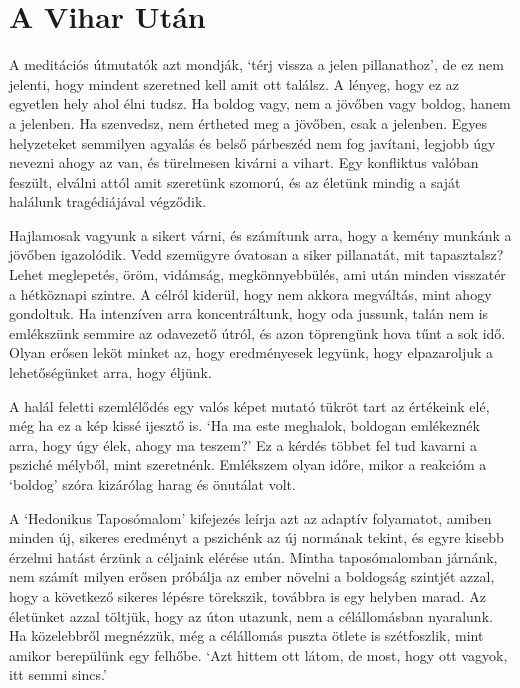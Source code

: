 \clearpage

\section{A Vihar Után}


\noindent A meditációs útmutatók azt mondják, `térj vissza a jelen
pillanathoz', de ez nem jelenti, hogy mindent szeretned kell amit ott
találsz. A lényeg, hogy ez az egyetlen hely ahol élni tudsz. Ha boldog
vagy, nem a jövőben vagy boldog, hanem a jelenben. Ha szenvedsz, nem
értheted meg a jövőben, csak a jelenben. Egyes helyzeteket semmilyen
agyalás és belső párbeszéd nem fog javítani, legjobb úgy nevezni ahogy
az van, és türelmesen kivárni a vihart. Egy konfliktus valóban feszült,
elválni attól amit szeretünk szomorú, és az életünk mindig a saját
halálunk tragédiájával végződik.

Hajlamosak vagyunk a sikert várni, és számítunk arra, hogy a kemény
munkánk a jövőben igazolódik. Vedd szemügyre óvatosan a siker
pillanatát, mit tapasztalsz? Lehet meglepetés, öröm, vidámság,
megkönnyebbülés, ami után minden visszatér a hétköznapi szintre. A
célról kiderül, hogy nem akkora megváltás, mint ahogy gondoltuk. Ha
intenzíven arra koncentráltunk, hogy oda jussunk, talán nem is
emlékszünk semmire az odavezető útról, és azon töprengünk hova tűnt a
sok idő. Olyan erősen leköt minket az, hogy eredményesek legyünk, hogy
elpazaroljuk a lehetőségünket arra, hogy éljünk.


A halál feletti szemlélődés egy valós képet mutató tükröt tart az
értékeink elé, még ha ez a kép kissé ijesztő is. `Ha ma este meghalok,
boldogan emlékeznék arra, hogy úgy élek, ahogy ma teszem?' Ez a kérdés
többet fel tud kavarni a psziché mélyből, mint szeretnénk. Emlékszem
olyan időre, mikor a reakcióm a `boldog' szóra kizárólag harag és
önutálat volt.

A `Hedonikus Taposómalom' kifejezés leírja azt az adaptív folyamatot,
amiben minden új, sikeres eredményt a pszichénk az új normának tekint,
és egyre kisebb érzelmi hatást érzünk a céljaink elérése után. Mintha
taposómalomban járnánk, nem számít milyen erősen próbálja az ember
növelni a boldogság szintjét azzal, hogy a következő sikeres lépésre
törekszik, továbbra is egy helyben marad. Az életünket azzal töltjük,
hogy az úton utazunk, nem a célállomásban nyaralunk. Ha közelebbről
megnézzük, még a célállomás puszta ötlete is szétfoszlik, mint amikor
berepülünk egy felhőbe. `Azt hittem ott látom, de most, hogy ott vagyok,
itt semmi sincs.'

